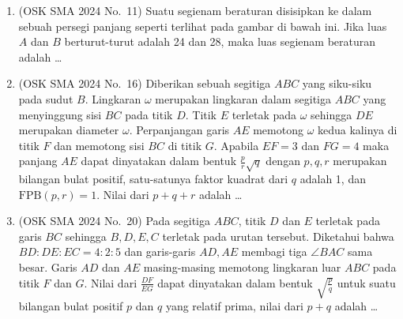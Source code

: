 \documentclass[12pt,a4paper]{article}
\begin{document}
\begin{enumerate}
\item (OSK SMA 2024 No.\ 11) Suatu segienam beraturan disisipkan ke dalam sebuah persegi panjang seperti terlihat pada gambar di bawah ini. Jika luas $A$ dan $B$ berturut-turut adalah 24 dan 28, maka luas segienam beraturan adalah \dots

\begin{center}
\end{center}

\item (OSK SMA 2024 No.\ 16) Diberikan sebuah segitiga $ABC$ yang siku-siku pada sudut $B$. Lingkaran $\omega$ merupakan lingkaran dalam segitiga $ABC$ yang menyinggung sisi $BC$ pada titik $D$. Titik $E$ terletak pada $\omega$ sehingga $DE$ merupakan diameter $\omega$. Perpanjangan garis $AE$ memotong $\omega$ kedua kalinya di titik $F$ dan memotong sisi $BC$ di titik $G$. Apabila $EF=3$ dan $FG=4$ maka panjang $AE$ dapat dinyatakan dalam bentuk $\frac{p}{r}\sqrt{q}$ dengan $p,q,r$ merupakan bilangan bulat positif, satu-satunya faktor kuadrat dari $q$ adalah 1, dan $\text{FPB}(p,r)=1$. Nilai dari $p+q+r$ adalah \dots

\item (OSK SMA 2024 No.\ 20) Pada segitiga $ABC$, titik $D$ dan $E$ terletak pada garis $BC$ sehingga $B, D, E, C$ terletak pada urutan tersebut. Diketahui bahwa $BD:DE:EC=4:2:5$ dan garis-garis $AD, AE$ membagi tiga $\angle BAC$ sama besar. Garis $AD$ dan $AE$ masing-masing memotong lingkaran luar $ABC$ pada titik $F$ dan $G$. Nilai dari $\frac{DF}{EG}$ dapat dinyatakan dalam bentuk $\sqrt{\frac{p}{q}}$ untuk suatu bilangan bulat positif $p$ dan $q$ yang relatif prima, nilai dari $p+q$ adalah \dots


\end{enumerate}
\end{document}
